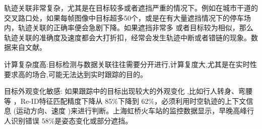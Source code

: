 轨迹关联非常复杂，尤其是在目标较多或者遮挡严重的情况下。例如在城市干道的交叉路口处，如果每帧图像中目标超多50个，或是在有大量遮挡情况下的停车场内，轨迹关联的正确率便会急剧下降。如果遮挡非常多 或者目标较为相似，那么轨迹关联的准确度及速度都会大打折扣，经常会发生轨迹中断或者错链的现象。数据来自文献\cite{wang2014unified}。



计算复杂度高:目标检测与数据关联往往需要分开进行,计算复度大,尤其是在实时性要求高的场合,可能无法达到实时跟踪的目的。




目标外观变化敏感: 如果跟踪中的目标出现较大的外观变化 ,比如行人转身、弯腰等 ，Re-ID特征匹配精度下降从 85\%下降到 62\%，必须利用时空轨迹的上下文信息 (运动方向、速度 )来进行判断。上海虹桥火车站的监控数据显示，早晚高峰行人识别错误 58\%是姿态变化或部分遮挡\cite{li2023pedestrian}。







